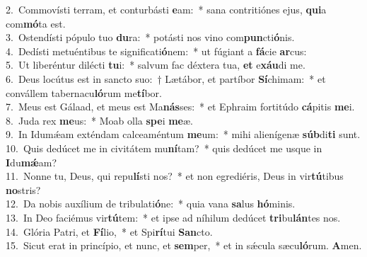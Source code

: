 {2.~}Commovísti terram, et conturbásti \textbf{e}am:~* sana contritiónes ejus, \textbf{qui}a com\textbf{mó}ta est.\\
{3.~}Ostendísti pópulo tuo \textbf{du}ra:~* potásti nos vino com\textbf{pun}cti\textbf{ó}nis.\\
{4.~}Dedísti metuéntibus te significati\textbf{ó}nem:~* ut fúgiant a \textbf{fá}cie \textbf{ar}cus:\\
{5.~}Ut liberéntur dilécti \textbf{tu}i:~* salvum fac déxtera tua, \textbf{et} e\textbf{xáu}di me.\\
{6.~}Deus locútus est in sancto suo:~† Lætábor, et partíbor \textbf{Sí}chimam:~* et convállem tabernacu\textbf{ló}rum me\textbf{tí}bor.\\
{7.~}Meus est Gálaad, et meus est Ma\textbf{nás}ses:~* et Ephraim fortitúdo \textbf{cá}pitis \textbf{me}i.\\
{8.~}Juda rex \textbf{me}us:~* Moab olla \textbf{spe}i \textbf{me}æ.\\
{9.~}In Idumǽam exténdam calceaméntum \textbf{me}um:~* mihi alienígenæ \textbf{súb}di\textbf{ti} sunt.\\
{10.~}Quis dedúcet me in civitátem mu\textbf{ní}tam?~* quis dedúcet me usque in \textbf{I}du\textbf{mǽ}am?\\
{11.~}Nonne tu, Deus, qui repu\textbf{lí}sti nos?~* et non egrediéris, Deus in vir\textbf{tú}tibus \textbf{no}stris?\\
{12.~}Da nobis auxílium de tribulati\textbf{ó}ne:~* quia vana \textbf{sa}lus \textbf{hó}minis.\\
{13.~}In Deo faciémus vir\textbf{tú}tem:~* et ipse ad níhilum dedúcet \textbf{tri}bu\textbf{lán}tes nos.\\
{14.~}Glória Patri, et \textbf{Fí}lio,~* et Spi\textbf{rí}tui \textbf{San}cto.\\
{15.~}Sicut erat in princípio, et nunc, et \textbf{sem}per,~* et in sǽcula sæcu\textbf{ló}rum. \textbf{A}men.\\

